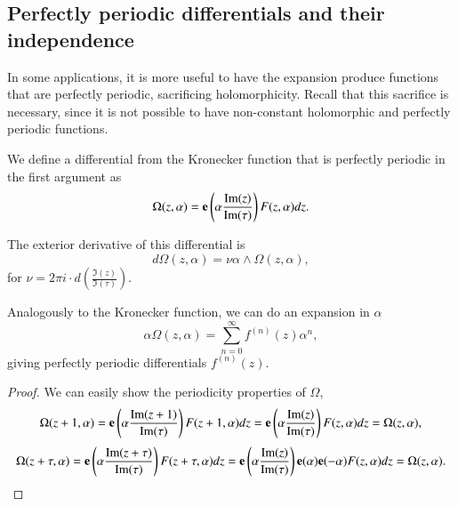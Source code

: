 \subsection{Perfectly periodic differentials and their independence}

In some applications, it is more useful to have the expansion produce functions that are perfectly periodic, sacrificing holomorphicity.
Recall that this sacrifice is necessary, since it is not possible to have non-constant holomorphic and perfectly periodic functions.

\begin{definition}
    We define a differential from the Kronecker function that is perfectly periodic in the first argument as
    \begin{equation}
        \Omega(z,\alpha) = \mathbf{e}\left( \alpha \frac{\operatorname{Im}(z)}{\operatorname{Im}(\tau)}\right) F(z,\alpha) dz.
    \end{equation}

    The exterior derivative of this differential is
    \begin{equation}
        d\Omega(z,\alpha) = \nu \alpha \wedge \Omega(z,\alpha),
    \end{equation}
    for $\nu = 2 \pi i \cdot d\!\left(\frac{\Im(z)}{\Im(\tau)}\right)$.

    Analogously to the Kronecker function, we can do an expansion in $\alpha$
    \begin{equation}
        \alpha \Omega(z,\alpha) = \sum_{n=0}^\infty f^{(n)}(z) \alpha^n,
    \end{equation}
    giving perfectly periodic differentials $f^{(n)}(z)$.
\end{definition}

\begin{proof}
    We can easily show the periodicity properties of $\Omega$,
    \begin{equation}
        \Omega(z+1,\alpha) = \mathbf{e}\left( \alpha \frac{\operatorname{Im}(z+1)}{\operatorname{Im}(\tau)}\right) F(z+1,\alpha) dz = \mathbf{e}\left( \alpha \frac{\operatorname{Im}(z)}{\operatorname{Im}(\tau)}\right) F(z,\alpha) dz = \Omega(z,\alpha),
    \end{equation}
    \begin{equation}
        \Omega(z+\tau,\alpha) = \mathbf{e}\left( \alpha \frac{\operatorname{Im}(z+\tau)}{\operatorname{Im}(\tau)} \right) F(z+\tau,\alpha) dz = \mathbf{e}\left( \alpha \frac{\operatorname{Im}(z)}{\operatorname{Im}(\tau)}\right) \mathbf{e}(\alpha) \mathbf{e}(-\alpha) F(z,\alpha) dz = \Omega(z,\alpha).
    \end{equation}
\end{proof}

